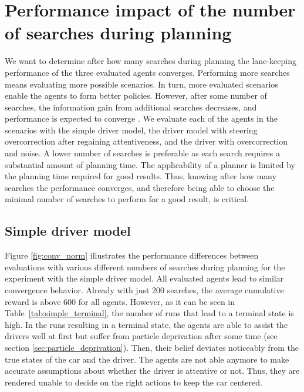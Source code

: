 \section{Performance impact of the number of searches during planning}
\label{sec:convergence}

We want to determine after how many searches during planning the lane-keeping performance of the three evaluated agents converges. Performing more searches means evaluating more possible scenarios. In turn, more evaluated scenarios enable the agents to form better policies. However, after some number of searches, the information gain from additional searches decreases, and performance is expected to converge \parencite{pomcp}. We evaluate each of the agents in the scenarios with the simple driver model, the driver model with steering overcorrection after regaining attentiveness, and the driver with overcorrection and noise. A lower number of searches is preferable as each search requires a substantial amount of planning time. The applicability of a planner is limited by the planning time required for good results. Thus, knowing after how many searches the performance converges, and therefore being able to choose the minimal number of searches to perform for a good result, is critical. 


\subsection{Simple driver model}

Figure \ref{fig:conv_norm} illustrates the performance differences between evaluations with various different numbers of searches during planning for the experiment with the simple driver model. All evaluated agents lead to similar convergence behavior. Already with just 200 searches, the average cumulative reward is above 600 for all agents. However, as it can be seen in Table~\ref{tab:simple_terminal}, the number of runs that lead to a terminal state is high. In the runs resulting in a terminal state, the agents are able to assist the drivers well at first but suffer from particle deprivation after some time (see section \ref{sec:particle_deprivation}). Then, their belief deviates noticeably from the true states of the car and the driver. The agents are not able anymore to make accurate assumptions about whether the driver is attentive or not. Thus, they are rendered unable to decide on the right actions to keep the car centered.

